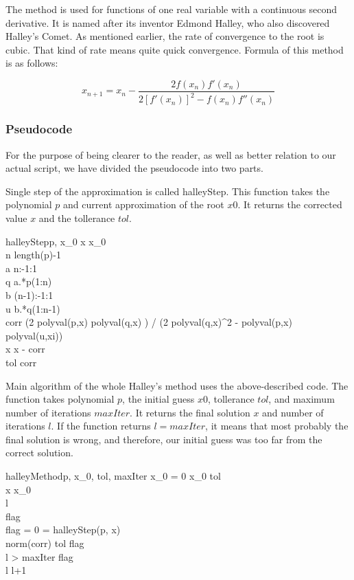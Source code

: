\documentclass{article}
\begin{document}
The method is used for functions of one real variable with a continuous second derivative. It is
named after its inventor Edmond Halley, who also discovered Halley's Comet. As mentioned earlier,
the rate of convergence to the root is cubic. That kind of rate means quite quick convergence.
Formula of this method is as follows:

\[ x_{n+1} = x_n - \frac{2 f(x_n) f'(x_n)}{2 [f'(x_n)]^2 - f(x_n)f''(x_n)} \]

\subsubsection{Pseudocode}

For the purpose of being clearer to the reader, as well as better relation to our actual script, we
have divided the pseudocode into two parts.

Single step of the approximation is called halleyStep. This function takes the polynomial $p$ and
current approximation of the root $x0$. It returns the corrected value $x$ and the tollerance $tol$.

\begin{pseudocode}{halleyStep}{p, x_0}
	x \gets x_0 \\
	n \gets length(p)-1 \\
	a \gets n:-1:1 \\
	q \gets a.*p(1:n) \\
	b \gets (n-1):-1:1 \\
	u \gets b.*q(1:n-1) \\
	corr \gets (2 \times polyval(p,x) \times polyval(q,x) ) / (2 \times polyval(q,x)^2 - polyval(p,x)
	\times polyval(u,xi)) \\
	x \gets x - corr \\
	tol \gets corr \\
\end{pseudocode}

Main algorithm of the whole Halley's method uses the above-described code. The function
takes polynomial $p$, the initial guess $x0$, tollerance $tol$, and maximum number of iterations
$maxIter$. It returns the final solution $x$ and number of iterations $l$. If the function returns
$l = maxIter$, it means that most probably the final solution is wrong, and therefore, our initial
guess was too far from the correct solution.

\begin{pseudocode}{halleyMethod}{p, x_0, tol, maxIter}
	\IF x_0 = 0 \THEN
		x_0 \gets tol \\
	x \gets x_0 \\
	l  \\
	flag \\
	\WHILE flag = 0 \DO
	\BEGIN
		 = halleyStep(p, x) \\
		\IF norm(corr) \leq tol \THEN
			flag  \\
		\IF l > maxIter \THEN
			flag  \\
		l \gets l+1 \\
	\END \\
\end{pseudocode}
\end{document}
